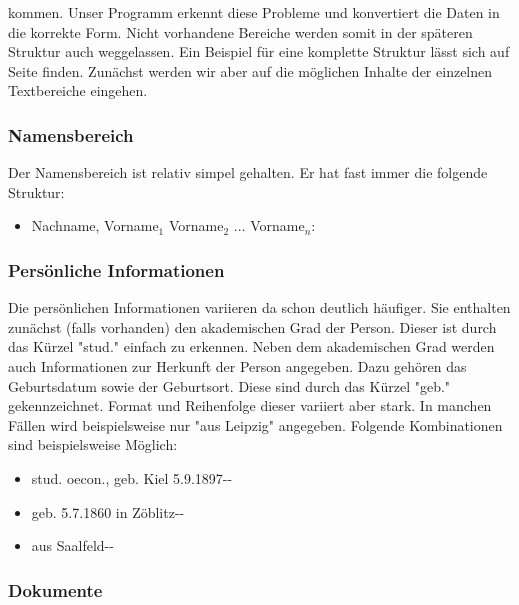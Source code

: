 \noindent
kommen. Unser Programm erkennt diese Probleme und konvertiert die Daten in die korrekte Form. Nicht vorhandene Bereiche werden somit in der späteren Struktur auch weggelassen. Ein Beispiel für eine komplette Struktur lässt sich auf Seite \pageref{sec:Beispielstruktur} finden. Zunächst werden wir aber auf die möglichen Inhalte der einzelnen Textbereiche eingehen.

\subsubsection{Namensbereich}
 \label{subsubsec:Namensbereich}

Der Namensbereich ist relativ simpel gehalten. Er hat fast immer die folgende Struktur: 

\begin{itemize}
 \item Nachname, Vorname$_1$ Vorname$_2$ ... Vorname$_n$:
\end{itemize} 
 
\subsubsection{Persönliche Informationen}
 \label{subsubsec:Persönliche Informationen}
 
Die persönlichen Informationen variieren da schon deutlich häufiger. Sie enthalten zunächst (falls vorhanden) den akademischen Grad der Person. Dieser ist durch das Kürzel "{}stud."{} einfach zu erkennen. Neben dem akademischen Grad werden auch Informationen zur Herkunft der Person angegeben. Dazu gehören das Geburtsdatum sowie der Geburtsort. Diese sind durch das Kürzel "{}geb."{} gekennzeichnet. Format und Reihenfolge dieser variiert aber stark. In manchen Fällen wird beispielsweise nur "{}aus Leipzig"{} angegeben. Folgende Kombinationen sind beispielsweise Möglich: 

\begin{itemize}
 \item stud. oecon., geb. Kiel 5.9.1897-{}-
\vspace*{-0.2cm} 
 \item geb. 5.7.1860 in  Zöblitz-{}-
\vspace*{-0.2cm} 
 \item aus Saalfeld-{}-
\end{itemize} 
  
\subsubsection{Dokumente}  
 \label{subsubsec:Dokumente}

